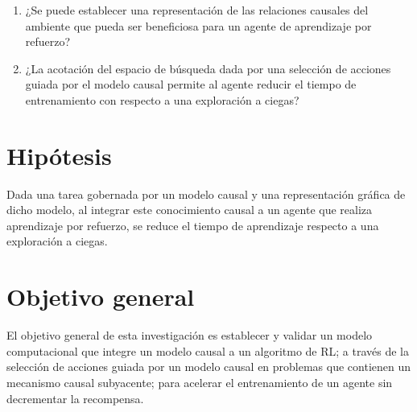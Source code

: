\begin{enumerate}
\item ¿Se puede establecer una representación de las relaciones causales
del ambiente que pueda ser beneficiosa para un agente
de aprendizaje por refuerzo?
    
    \item ¿La acotación del espacio de búsqueda dada por una selección de acciones guiada por el modelo causal permite al agente reducir el tiempo de entrenamiento con respecto a una exploración a ciegas?
\end{enumerate}
\section{Hipótesis}



Dada una tarea gobernada por un modelo causal y una representación
gráfica de dicho modelo, al integrar este conocimiento causal
a un agente que realiza aprendizaje por refuerzo, se reduce
el tiempo de aprendizaje respecto a una exploración a ciegas.



\section{Objetivo general}
El objetivo general de esta investigación
es establecer y validar un modelo computacional que integre 
un modelo causal a un algoritmo de RL; a través de
la selección de acciones guiada por un 
modelo causal en problemas que contienen
un mecanismo causal subyacente; para acelerar el entrenamiento de un agente sin decrementar la recompensa.


